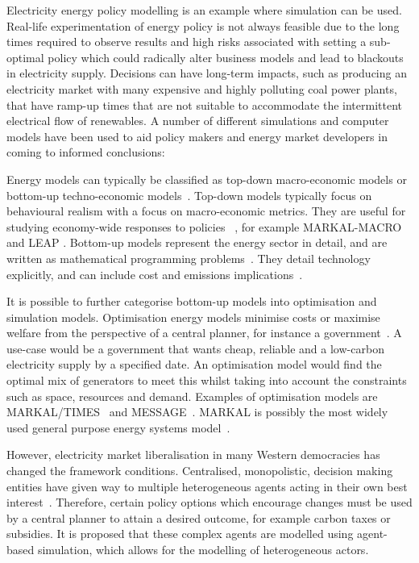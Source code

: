 Electricity energy policy modelling is an example where simulation can be used. Real-life experimentation of energy policy is not always feasible due to the long times required to observe results and high risks associated with setting a sub-optimal policy which could radically alter business models and lead to blackouts in electricity supply. Decisions can have long-term impacts, such as producing an electricity market with many expensive and highly polluting coal power plants, that have ramp-up times that are not suitable to accommodate the intermittent electrical flow of renewables. A number of different simulations and computer models have been used to aid policy makers and energy market developers in coming to informed conclusions:

Energy models can typically be classified as top-down macro-economic models or bottom-up techno-economic models~\cite{Bohringer1998}. Top-down models typically focus on behavioural realism with a focus on macro-economic metrics. They are useful for studying economy-wide responses to policies ~\cite{Hall2016}, for example MARKAL-MACRO \cite{Fishbone1981} and LEAP \cite{Heaps2016}. Bottom-up models represent the energy sector in detail, and are written as mathematical programming problems~\cite{Gargiulo2013}. They detail technology explicitly, and can include cost and emissions implications~\cite{Hall2016}.

It is possible to further categorise bottom-up models into optimisation and simulation models. Optimisation energy models minimise costs or maximise welfare from the perspective of a central planner, for instance a government~\cite{Keles2017}. A use-case would be a government that wants cheap, reliable and a low-carbon electricity supply by a specified date. An optimisation model would find the optimal mix of generators to meet this whilst taking into account the constraints such as space, resources and demand. Examples of optimisation models are MARKAL/TIMES~\cite{Fishbone1981} and MESSAGE~\cite{Schrattenholzer1981}. MARKAL is possibly the most widely used general purpose energy systems model~\cite{Pfenninger2014}.

However, electricity market liberalisation in many Western democracies has changed the framework conditions. Centralised, monopolistic, decision making entities have given way to multiple heterogeneous agents acting in their own best interest~\cite{Most2010}. Therefore, certain policy options which encourage changes must be used by a central planner to attain a desired outcome, for example carbon taxes or subsidies. It is proposed that these complex agents are modelled using agent-based simulation, which allows for the modelling of heterogeneous actors.

